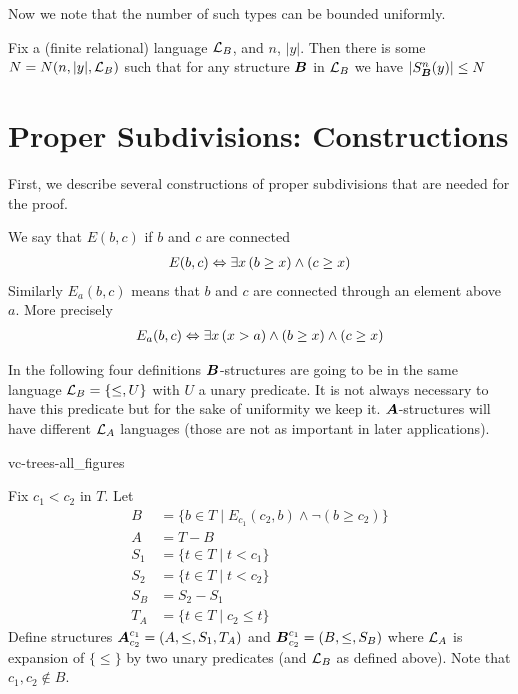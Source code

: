 \documentclass{amsart}
\DeclareMathOperator{\A}{\boldface A}
\DeclareMathOperator{\B}{\boldface B}
\begin{document}
Now we note that the number of such types can be bounded uniformly.

\begin{Note} \label{nt_type_count}
	Fix a (finite relational) language $\mathcal L_B$, and $n$, $|y|$. Then there is some $N = N(n, |y|, \mathcal L_B)$ such that for any structure $\B$ in $\mathcal L_B$ we have $|S^n_{\B}(y)| \leq N$ 
\end{Note}


\section{Proper Subdivisions: Constructions}

First, we describe several constructions of proper subdivisions that are needed for the proof. 

\begin{Definition}
	We say that $E(b, c)$ if $b$ and $c$ are connected
	\begin{align*}
		E(b, c) \Leftrightarrow \exists x \, (b \geq x) \wedge (c \geq x)
	\end{align*}
	Similarly $E_a(b, c)$ means that $b$ and $c$ are connected through an element above $a$. More precisely
	\begin{align*}
		E_a(b, c) \Leftrightarrow \exists x \, (x > a) \wedge (b \geq x) \wedge (c \geq x)
	\end{align*}
\end{Definition}

In the following four definitions $\B$-structures are going to be in the same language $\mathcal L_B = \{\leq, U\}$ with $U$ a unary predicate. It is not always necessary to have this predicate but for the sake of uniformity we keep it. $\A$-structures will have different $\mathcal L_A$ languages (those are not as important in later applications).

 {vc-trees-all_figures}

\begin{Definition}
	Fix $c_1 < c_2$ in $T$. Let
	\begin{align*}
		B &= \{b \in T \mid E_{c_1}(c_2, b) \wedge \neg(b \geq c_2)\} \\
		A &= T - B \\
		S_1 &= \{t \in T \mid t < c_1\} \\
		S_2 &= \{t \in T \mid t < c_2\} \\
		S_B &= S_2 - S_1 \\
		T_A &= \{t \in T \mid c_2 \leq t\}
	\end{align*}
	Define structures $\A^{c_1}_{c_2} = (A, \leq, S_1, T_A)$ and $\B^{c_1}_{c_2} = (B, \leq, S_B)$ where $\mathcal L_A$ is expansion of $\{\leq\}$ by two unary predicates (and $\mathcal L_B$ as defined above). Note that $c_1, c_2 \notin B$.
\end{Definition}
\end{document}
